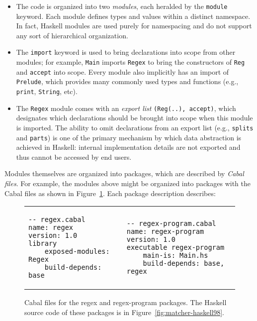 \begin{itemize}
    \item The code is organized into two \emph{modules}, each heralded
    by the \verb|module| keyword.  Each module defines types and values
    within a distinct namespace.  In fact, Haskell modules are used purely for
    namespacing and do not support any sort of hierarchical organization.

    \item The \verb|import| keyword is used to bring declarations into
    scope from other modules; for example, \verb|Main| imports \verb|Regex|
    to bring the constructors of \verb|Reg| and \verb|accept| into scope.
    Every module also implicitly has an import of \verb|Prelude|, which
    provides many commonly used types and functions (e.g., \verb|print|,
    \verb|String|, etc).

    \item The \verb|Regex| module comes with an \emph{export list}
    \verb|(Reg(..), accept)|, which designates which declarations should
    be brought into scope when this module is imported.  The ability to
    omit declarations from an export list (e.g., \verb|splits| and \verb|parts|)
    is one of the primary mechanism by which data abstraction is achieved in
    Haskell: internal implementation details are not exported and thus
    cannot be accessed by end users.
\end{itemize}
Modules themselves are organized into packages, which are described by
\emph{Cabal files}.  For example, the modules above might be organized into
packages with the Cabal files as shown in Figure~\ref{fig:matcher-packages}.
Each package description describes:

\begin{figure}
\begin{tabular}{p{} p{}}
\begin{lstlisting}[language=Cabal]
-- regex.cabal
name: regex
version: 1.0
library
    exposed-modules: Regex
    build-depends: base
\end{lstlisting}
&
\begin{lstlisting}[language=Cabal]
-- regex-program.cabal
name: regex-program
version: 1.0
executable regex-program
    main-is: Main.hs
    build-depends: base, regex
\end{lstlisting}
\end{tabular}
\caption{Cabal files for the regex and regex-program packages. The Haskell source code
of these packages is in Figure~\ref{fig:matcher-haskell98}.}
\label{fig:matcher-packages}
\end{figure}

